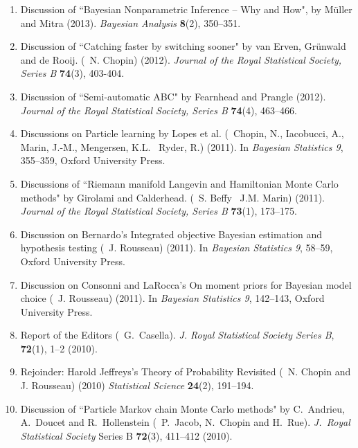 \begin{enumerate}
\item Discussion of ``Bayesian Nonparametric Inference -- Why and How", by M\"uller and Mitra (2013).
{\em Bayesian Analysis} {\bf 8}(2), 350--351.

\item Discussion of ``Catching faster by switching sooner" by van Erven, Gr\"unwald and de Rooij.
(\avec~N. Chopin) (2012). {\em Journal of the Royal Statistical Society, Series B} {\bf 74}(3), 403-404.
 
\item Discussion of ``Semi-automatic ABC" by Fearnhead and Prangle (2012).
{\em Journal of the Royal Statistical Society, Series B} {\bf 74}(4), 463--466.
 
\item Discussions on Particle learning by Lopes et al.
(\avec~Chopin, N., Iacobucci, A., Marin, J.-M., Mengersen, 
K.L. \et~Ryder, R.) (2011). In {\em Bayesian Statistics 9}, 355--359, Oxford University Press.

\item Discussions of ``Riemann manifold Langevin and Hamiltonian Monte Carlo methods" by Girolami and Calderhead.
(\avec~S. Beffy \et~J.M. Marin) (2011). {\em Journal of the Royal Statistical Society, Series B} {\bf 73}(1),
173--175.

\item Discussion on Bernardo's Integrated objective Bayesian estimation and hypothesis testing
(\avec~J. Rousseau) (2011). In {\em Bayesian Statistics 9}, 58--59, Oxford University Press.

\item Discussion on Consonni and LaRocca's On moment priors for Bayesian model choice (\avec~J. Rousseau) (2011).
In {\em Bayesian Statistics 9}, 142--143, Oxford University Press.

\item Report of the Editors (\avec\ G.~Casella). {\em J. 
Royal Statistical Society Series B}, {\bf 72}(1), 1--2 (2010).

\item Rejoinder: Harold Jeffreys's Theory of Probability Revisited
(\avec~N. Chopin and J. Rousseau) (2010)
{\em Statistical Science} {\bf 24}(2), 191--194.

\item Discussion of ``Particle Markov chain Monte Carlo methods" by C.~Andrieu, A.~Doucet and R.~Hollenstein 
(\avec\ P.~Jacob, N.~Chopin and H.~Rue). {\em J.~Royal Statistical Society} Series B {\bf 72}(3), 411--412 
(2010).


\end{enumerate}
